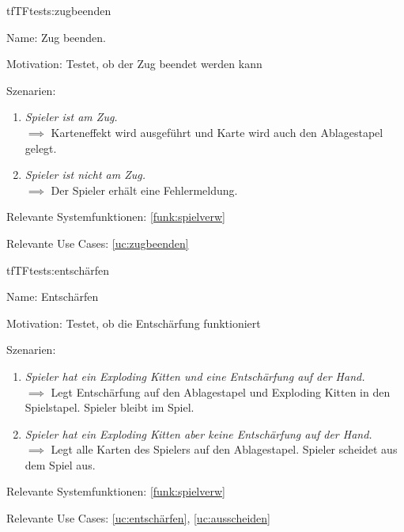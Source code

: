 \begin{description}[leftmargin=5em, style=sameline]

\begin{lhp}{tf}{TF}{tests:zugbeenden}
	\item [Name:] Zug beenden.
	\item [Motivation:] Testet, ob der Zug beendet werden kann
	\item [Szenarien:] \hfill
		\begin{enumerate}
			\item \textit{Spieler ist am Zug.} \\ $\implies$ Karteneffekt wird ausgeführt und Karte wird auch den Ablagestapel gelegt.
			\item \textit{Spieler ist nicht am Zug.} \\ $\implies$ Der Spieler erhält eine Fehlermeldung.
		\end{enumerate}
	\item [Relevante Systemfunktionen:] \ref{funk:spielverw}
	\item [Relevante Use Cases:] \ref{uc:zugbeenden}
\end{lhp}

\end{description}

\begin{description}[leftmargin=5em, style=sameline]

\begin{lhp}{tf}{TF}{tests:entschärfen}
	\item [Name:] Entschärfen
	\item [Motivation:] Testet, ob die Entschärfung funktioniert
	\item [Szenarien:] \hfill
		\begin{enumerate}
			\item \textit{Spieler hat ein Exploding Kitten und eine Entschärfung auf der Hand.} \\ $\implies$  Legt Entschärfung auf den Ablagestapel und Exploding Kitten in den Spielstapel. Spieler bleibt im Spiel.
			\item \textit{Spieler hat ein Exploding Kitten aber keine Entschärfung auf der Hand.} \\ $\implies$  Legt alle Karten des Spielers auf den Ablagestapel. Spieler scheidet aus dem Spiel aus.		
		\end{enumerate}
	\item [Relevante Systemfunktionen:] \ref{funk:spielverw}
	\item [Relevante Use Cases:] \ref{uc:entschärfen}, \ref{uc:ausscheiden}
\end{lhp}

\end{description}


